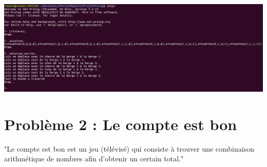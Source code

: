 \documentclass[12pt,a4paper]{article}
\begin{document}
\begin{center}
\includegraphics[width = 425pt]{SolutionRiviere.png}
\end{center}



\section{Problème 2 : Le compte est bon}
"Le compte est bon est un jeu (télévisé) qui consiste à trouver une combinaison arithmétique de nombres afin d'obtenir un certain total."
\end{document}
